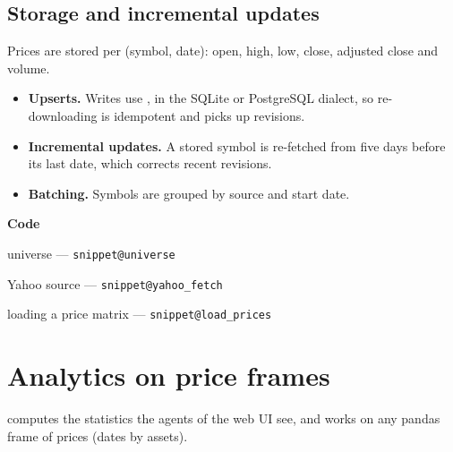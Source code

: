 \documentclass[11pt,a4paper]{article}
\makeatletter
\newcommand{\snippetsource}[1]{\csname snippet@#1\endcsname}
\newcommand{\snippet}[3]{%
  }
\newenvironment{codepointers}{%
  \par\smallskip\begingroup\footnotesize\noindent\textcolor{blue!50!black}{\textbf{Code}}\par\nopagebreak
  \begin{list}{}{\setlength{\leftmargin}{1.2em}\setlength{\itemsep}{0pt}\setlength{\parsep}{0pt}\setlength{\topsep}{1pt}}}%
  {\end{list}\endgroup\smallskip}
\newcommand{\codeitem}[2]{\item #2 --- \texttt{\snippetsource{#1}}}
\makeatother
\begin{document}
\subsection{Storage and incremental updates}
Prices are stored per (symbol, date): open, high, low, close, adjusted close and volume.
\begin{itemize}
  \item \textbf{Upserts.} Writes use , in the SQLite
        or PostgreSQL dialect, so re-downloading is idempotent and picks up revisions.
  \item \textbf{Incremental updates.} A stored symbol is re-fetched from five days before
        its last date, which corrects recent revisions.
  \item \textbf{Batching.} Symbols are grouped by source and start date.
\end{itemize}
\snippet{upsert_rows}{Python}{Portable upsert}
\snippet{update_market_data}{Python}{Incremental download}
\begin{codepointers}
  \codeitem{universe}{universe}
  \codeitem{yahoo_fetch}{Yahoo source}
  \codeitem{load_prices}{loading a price matrix}
\end{codepointers}

\section{Analytics on price frames}\label{sec:stats}
 computes the statistics the agents of the web UI see, and works on any
pandas frame of prices (dates by assets).
\end{document}
